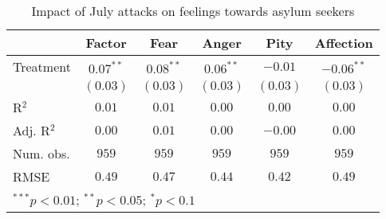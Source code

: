 
\begin{table}
\caption{Impact of July attacks on feelings towards asylum seekers}
\begin{center}
\begin{tabular}{l c c c c c}
\toprule
 & Factor & Fear & Anger & Pity & Affection \\
\midrule
Treatment  & $0.07^{**}$ & $0.08^{**}$ & $0.06^{**}$ & $-0.01$  & $-0.06^{**}$ \\
           & $(0.03)$    & $(0.03)$    & $(0.03)$    & $(0.03)$ & $(0.03)$     \\
\midrule
R$^2$      & $0.01$      & $0.01$      & $0.00$      & $0.00$   & $0.00$       \\
Adj. R$^2$ & $0.00$      & $0.01$      & $0.00$      & $-0.00$  & $0.00$       \\
Num. obs.  & $959$       & $959$       & $959$       & $959$    & $959$        \\
RMSE       & $0.49$      & $0.47$      & $0.44$      & $0.42$   & $0.49$       \\
\bottomrule
\multicolumn{6}{l}{\scriptsize{$^{***}p<0.01$; $^{**}p<0.05$; $^{*}p<0.1$}}
\end{tabular}
\label{tab_emo_no_controls}
\end{center}
\end{table}
